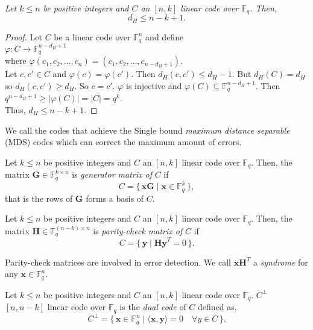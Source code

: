 \begin{theorem}
\textit{Let $k \leq n$ be positive integers and $C$ an $[n, k]$ linear code over $\mathbb{F}_q$. Then,}
\[
d_H \leq n - k + 1.
\]
\end{theorem}

\begin{proof}
    Let $C$ be a linear code over $\mathbb{F}_q^n$ and define\\
    $\varphi: C \xrightarrow{}\mathbb{F}_q^{n-d_H+1}$\\
    where $\varphi(c_1, c_2, \dots,c_n) = (c_1,c_2,\dots,c_{n-d_H+1})$.\\ 
    Let $c,c' \in C$ and $\varphi(c)=\varphi(c')$.
    Then $d_H(c, c') \leq d_H-1$.
    But $d_H(C)=d_H$ so $d_H(c, c') \geq d_H$. So $c = c'$. 
    $\varphi$ is injective and $\varphi(C) \subseteq \mathbb{F}_q^{n-d_H+1}$. Then $q^{n-d_H+1}\geq|\varphi(C)|=|C|=q^k$.\\
    Thus, $d_H\leq n-k+1 $.
\end{proof}
We call the codes that achieve the Single bound \textit{maximum distance separable} (MDS) codes which can correct the maximum amount of errors.

\begin{definition}
Let $k \leq n$ be positive integers and $C$ an $[n, k]$ linear code over $\mathbb{F}_q$. Then, the matrix $\mathbf{G} \in \mathbb{F}_q^{k \times n}$ is \textit{generator matrix of} $C$ if 
\[
C = 
\{\, \mathbf{xG} \mid \mathbf{x} \in \mathbb{F}_q^k\,\},
\]
that is the rows of $\mathbf{G}$ forms a basis of $C$.
\end{definition}

\begin{definition}
Let $k \leq n$ be positive integers and $C$ an $[n, k]$ linear code over $\mathbb{F}_q$. Then, the matrix $\mathbf{H} \in \mathbb{F}_q^{(n-k) \times n}$ is \textit{parity-check matrix of} $C$ if 
\[
C = 
\{\, \mathbf{y} \mid \mathbf{Hy}^T = 0\,\}.
\]
\end{definition}
Parity-check matrices are involved in error detection.
We call $\mathbf{xH}^T$ a \textit{syndrome} for any $\mathbf{x} \in \mathbb{F}_q^n$.

\begin{definition}
Let $k \leq n$ be positive integers and $C$ an $[n, k]$ linear code over $\mathbb{F}_q$. $C^\perp$ $[n, n-k]$ linear code over $\mathbb{F}_q$ is the \textit{dual code} of $C$ defined as,
\[
C^\perp =
\{\, \mathbf{x} \in \mathbb{F}_q^n \mid \langle \mathbf{x}, \mathbf{y} \rangle = 0 \quad \forall y \in C\,\}.
\]
\end{definition}

